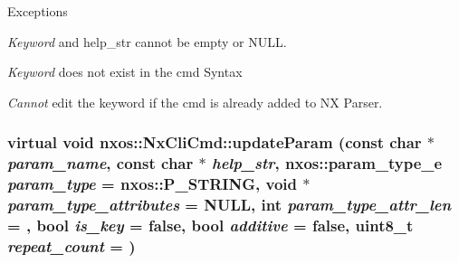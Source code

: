 \begin{DoxyExceptions}{Exceptions}
\item[{\em Keyword}]and help\_\-str cannot be empty or NULL. \item[{\em Keyword}]does not exist in the cmd Syntax \item[{\em Cannot}]edit the keyword if the cmd is already added to NX Parser. \end{DoxyExceptions}
\hypertarget{classnxos_1_1NxCliCmd_abc9244b0bcf22142b5d784c06a6aa91b}{
\subsubsection[{updateParam}]{\setlength{\rightskip}{0pt plus 5cm}virtual void nxos::NxCliCmd::updateParam (const char $\ast$ {\em param\_\-name}, \/  const char $\ast$ {\em help\_\-str}, \/  nxos::param\_\-type\_\-e {\em param\_\-type} = {\ttfamily nxos::P\_\-STRING}, \/  void $\ast$ {\em param\_\-type\_\-attributes} = {\ttfamily NULL}, \/  int {\em param\_\-type\_\-attr\_\-len} = {}, \/  bool {\em is\_\-key} = {\ttfamily false}, \/  bool {\em additive} = {\ttfamily false}, \/  uint8\_\-t {\em repeat\_\-count} = {})}}
\label{classnxos_1_1NxCliCmd_abc9244b0bcf22142b5d784c06a6aa91b}
